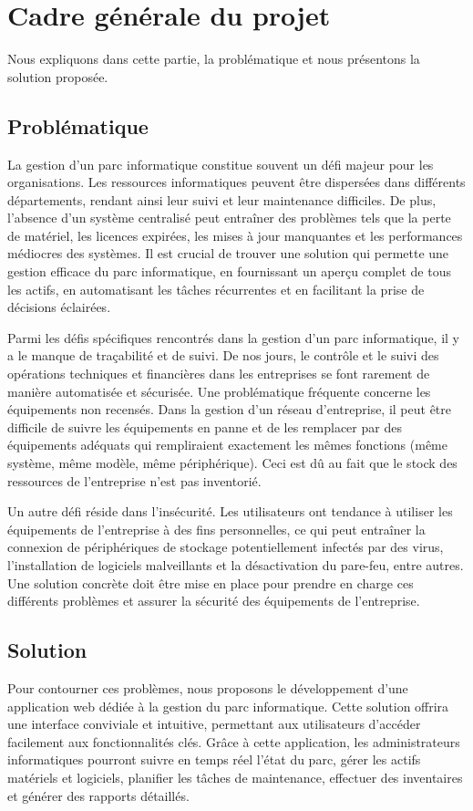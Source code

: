 \section{Cadre générale du projet}
Nous expliquons dans cette partie, la problématique et nous présentons la solution proposée.
\subsection{Problématique}
La gestion d'un parc informatique constitue souvent un défi majeur pour les organisations. Les ressources informatiques peuvent être dispersées dans différents départements, rendant ainsi leur suivi et leur maintenance difficiles. De plus, l'absence d'un système centralisé peut entraîner des problèmes tels que la perte de matériel, les licences expirées, les mises à jour manquantes et les performances médiocres des systèmes. Il est crucial de trouver une solution qui permette une gestion efficace du parc informatique, en fournissant un aperçu complet de tous les actifs, en automatisant les tâches récurrentes et en facilitant la prise de décisions éclairées.

Parmi les défis spécifiques rencontrés dans la gestion d'un parc informatique, il y a le manque de traçabilité et de suivi. De nos jours, le contrôle et le suivi des opérations techniques et financières dans les entreprises se font rarement de manière automatisée et sécurisée. Une problématique fréquente concerne les équipements non recensés. Dans la gestion d'un réseau d'entreprise, il peut être difficile de suivre les équipements en panne et de les remplacer par des équipements adéquats qui rempliraient exactement les mêmes fonctions (même système, même modèle, même périphérique). Ceci est dû au fait que le stock des ressources de l'entreprise n'est pas inventorié.

Un autre défi réside dans l'insécurité. Les utilisateurs ont tendance à utiliser les équipements de l'entreprise à des fins personnelles, ce qui peut entraîner la connexion de périphériques de stockage potentiellement infectés par des virus, l'installation de logiciels malveillants et la désactivation du pare-feu, entre autres. Une solution concrète doit être mise en place pour prendre en charge ces différents problèmes et assurer la sécurité des équipements de l'entreprise.

\subsection{Solution}
Pour contourner ces problèmes, nous proposons le développement d'une application web dédiée à la gestion du parc informatique. Cette solution offrira une interface conviviale et intuitive, permettant aux utilisateurs d'accéder facilement aux fonctionnalités clés. Grâce à cette application, les administrateurs informatiques pourront suivre en temps réel l'état du parc, gérer les actifs matériels et logiciels, planifier les tâches de maintenance, effectuer des inventaires et générer des rapports détaillés.

